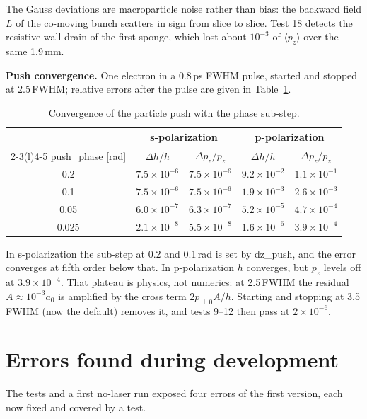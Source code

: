 \documentclass[11pt,a4paper]{article}
\newcommand{\code}[1]{{\fontencoding{OT1}\fontfamily{cmtt}\selectfont #1}}
\begin{document}
The Gauss deviations are macroparticle noise rather than bias: the backward field $L$ of the co-moving bunch scatters in sign from slice to slice. Test 18 detects the resistive-wall drain of the first sponge, which lost about $10^{-3}$ of $\langle p_z\rangle$ over the same 1.9\,mm.

\textbf{Push convergence.} One electron in a 0.8\,ps FWHM pulse, started and stopped at 2.5\,FWHM; relative errors after the pulse are given in Table~\ref{tab:conv}.

\begin{table}[H]
\centering\small
\caption{Convergence of the particle push with the phase sub-step.}\label{tab:conv}
\begin{tabular}{@{}c cc cc@{}}
\toprule
& \multicolumn{2}{c}{s-polarization} & \multicolumn{2}{c}{p-polarization}\\
\cmidrule(lr){2-3}\cmidrule(l){4-5}
\code{push\_phase} [rad] & $\Delta h/h$ & $\Delta p_z/p_z$ & $\Delta h/h$ & $\Delta p_z/p_z$\\
\midrule
0.2 & $7.5\times10^{-6}$ & $7.5\times10^{-6}$ & $9.2\times10^{-2}$ & $1.1\times10^{-1}$\\
0.1 & $7.5\times10^{-6}$ & $7.5\times10^{-6}$ & $1.9\times10^{-3}$ & $2.6\times10^{-3}$\\
0.05 & $6.0\times10^{-7}$ & $6.3\times10^{-7}$ & $5.2\times10^{-5}$ & $4.7\times10^{-4}$\\
0.025 & $2.1\times10^{-8}$ & $5.5\times10^{-8}$ & $1.6\times10^{-6}$ & $3.9\times10^{-4}$\\
\bottomrule
\end{tabular}
\end{table}

In s-polarization the sub-step at 0.2 and 0.1\,rad is set by \code{dz\_push}, and the error converges at fifth order below that. In p-polarization $h$ converges, but $p_z$ levels off at $3.9\times10^{-4}$. That plateau is physics, not numerics: at 2.5\,FWHM the residual $A\approx10^{-3}a_0$ is amplified by the cross term $2p_{\perp0}A/h$. Starting and stopping at 3.5\,FWHM (now the default) removes it, and tests 9--12 then pass at $2\times10^{-6}$.

\section{Errors found during development}

The tests and a first no-laser run exposed four errors of the first version, each now fixed and covered by a test.
\end{document}
